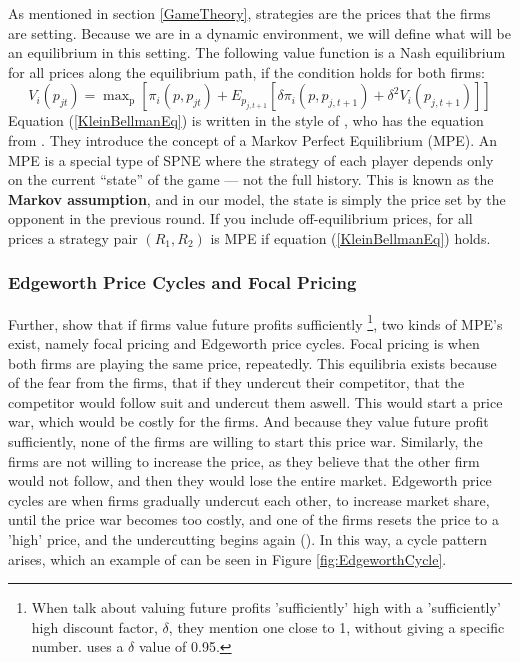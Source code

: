 \documentclass{article}
\begin{document}
As mentioned in section \ref{GameTheory}, strategies are the prices that the firms are setting.
\newline
Because we are in a dynamic environment, we will define what will be an equilibrium in this setting. 
The following value function is a Nash equilibrium for all prices along the equilibrium path, if the condition holds for both firms:
\begin{equation} \label{KleinBellmanEq}
    V_i(p_{jt}) = \mathop{\text{max}}_{\text{p}} [\pi_i (p,p_{jt}) + E_{p_{j,t+1}}[\delta \pi_i (p,p_{j,t+1})+\delta^2 V_i (p_{j,t+1}) ]]
\end{equation}
Equation (\ref{KleinBellmanEq}) is written in the style of \cite{Klein2021}, who has the equation from \cite{MaskinTirole}. They introduce the concept of a Markov Perfect Equilibrium (MPE). An MPE is a special type of SPNE where the strategy of each player depends only on the current “state” of the game — not the full history. This is known as the \textbf{Markov assumption}, and in our model, the state is simply the price set by the opponent in the previous round.
If you include off-equilibrium prices, for all prices a strategy pair $(R_1,R_2)$ is MPE if equation (\ref{KleinBellmanEq}) holds.

\subsubsection{Edgeworth Price Cycles and Focal Pricing} \label{EdgeworthFocalpricingSec}
Further, \cite{MaskinTirole} show that if firms value future profits sufficiently \footnote{When \cite{MaskinTirole} talk about valuing future profits 'sufficiently' high with a 'sufficiently' high discount factor, $\delta$, they mention one close to 1, without giving a specific number. \cite{Klein2021} uses a $\delta$ value of 0.95.}, two kinds of MPE's exist, 
namely focal pricing and Edgeworth price cycles.
Focal pricing is when both firms are playing the same price, repeatedly. This equilibria exists because of the fear from the firms, that if they undercut their competitor, that the competitor would follow suit and undercut them aswell. This would start a price war, which would be costly for the firms. And because they value future profit sufficiently, none of the firms are willing to start this price war. Similarly, the firms are not willing to increase the price, as they believe that the other firm would not follow, and then they would lose the entire market.
\newline
Edgeworth price cycles are when firms gradually undercut each other, to increase market share, until the price war becomes too costly, and one of the firms resets the price to a 'high' price, and the undercutting begins again (\cite{MaskinTirole}). In this way, a cycle pattern arises, which an example of can be seen in Figure \ref{fig:EdgeworthCycle}.
\end{document}
